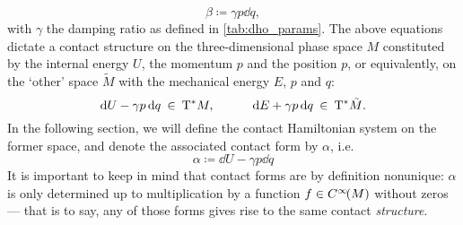 \begin{equation}
    \beta \coloneq \gamma p \dd{q},
    \label{eq:dho_work_form}
\end{equation}
with $\gamma$ the damping ratio as defined in \cref{tab:dho_params}. The above equations dictate a contact structure on the three-dimensional phase space $M$ constituted by the internal energy $U$, the momentum $p$ and the position $p$, or equivalently, on the `other' space $\tilde{M}$ with the mechanical energy $E$, $p$ and $q$:
$$ \dd{U} - \gamma p \dd{q} \: \in \: \mathrm{T}^*M, \qquad \quad \dd{E} + \gamma p \dd{q} \: \in \: \mathrm{T}^*\tilde{M}. $$
In the following section, we will define the contact Hamiltonian system on the former space, and denote the associated contact form by $\alpha$, i.e.
\begin{equation}
    \alpha \coloneq \dd{U} - \gamma p \dd{q}
    \label{eq:dho_contact_form_thermo}
\end{equation}
It is important to keep in mind that contact forms are by definition nonunique: $\alpha$ is only determined up to multiplication by a function $f \in C^\infty\!\qty(M)$ without zeros --- that is to say, any of those forms gives rise to the same contact \emph{structure}.

